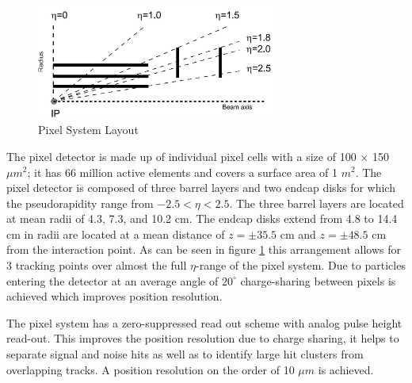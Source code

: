 \begin{figure}[hb]
  \centering
	\includegraphics[width=0.7\textwidth]{images/pixelLayout.png}
  	\caption[Pixel System Layout]
   	{Pixel System Layout}
	\label{fig:pixelLayout}
\end{figure}

The pixel detector is made up of individual pixel cells with a size of 
100 $\times$ 150 $\mu m^{2}$; it has 66 million active elements and covers
a surface area of 1 $m^{2}$. The pixel detector is composed of three barrel 
layers and two endcap disks for which the pseudorapidity range from $-2.5<\eta<2.5$.
The three barrel layers are located at mean radii of 4.3, 7.3, and 10.2 cm. 
The endcap disks extend from 4.8 to 14.4 cm in radii are located at a mean distance
of $z=\pm35.5$ cm and $z=\pm48.5$ cm from the interaction point. 
As can be seen in figure \ref{fig:pixelLayout} this arrangement allows for 3 tracking points over 
almost the full $\eta$-range of the pixel system. Due to 
particles entering the detector at an average angle of $20^{\circ}$ 
charge-sharing between pixels is achieved which improves position resolution.

The pixel system has a zero-suppressed read out scheme with analog pulse
height read-out. This improves the position resolution due to charge sharing,
it helps to separate signal and noise hits as well as to identify large hit 
clusters from overlapping tracks.
A position resolution on the order of 10 $\mu m$ is achieved.

